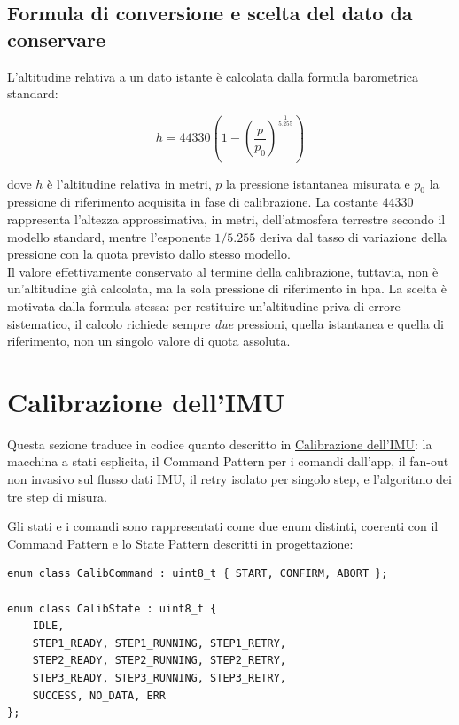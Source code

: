 \subsection{Formula di conversione e scelta del dato da conservare}

L'altitudine relativa a un dato istante è calcolata dalla formula
barometrica standard:

\begin{equation}
    h = 44330 \left( 1 - \left( \frac{p}{p_0} \right)^{\frac{1}{5.255}} \right)
    \label{eq:altitude-barometric}
\end{equation}

dove $h$ è l'altitudine relativa in metri, $p$ la pressione istantanea
misurata e $p_0$ la pressione di riferimento acquisita in fase di
calibrazione. La costante $44330$ rappresenta l'altezza approssimativa,
in metri, dell'atmosfera terrestre secondo il modello standard, mentre
l'esponente $1/5.255$ deriva dal tasso di variazione della pressione con
la quota previsto dallo stesso modello.\\

Il valore effettivamente conservato al termine della calibrazione, tuttavia,
non è un'altitudine già calcolata, ma la sola pressione di riferimento in
\gls{hpa}. La scelta è motivata dalla formula stessa: per restituire un'altitudine
priva di errore sistematico, il calcolo richiede sempre \emph{due} pressioni,
quella istantanea e quella di riferimento, non un singolo valore di quota
assoluta.

\newpage

\section{Calibrazione dell'IMU}

Questa sezione traduce in codice quanto descritto in
\hyperref[sec:calibrazione-imu]{Calibrazione dell'IMU}: la macchina a stati
esplicita, il Command Pattern per i comandi dall'app, il fan-out non invasivo
sul flusso dati IMU, il retry isolato per singolo step, e l'algoritmo dei tre
step di misura.

Gli stati e i comandi sono rappresentati come due enum distinti, coerenti con
il Command Pattern e lo State Pattern descritti in progettazione:

\begin{listing}[H]
\begin{verbatim}
enum class CalibCommand : uint8_t { START, CONFIRM, ABORT };

enum class CalibState : uint8_t {
    IDLE, 
    STEP1_READY, STEP1_RUNNING, STEP1_RETRY,
    STEP2_READY, STEP2_RUNNING, STEP2_RETRY,
    STEP3_READY, STEP3_RUNNING, STEP3_RETRY,
    SUCCESS, NO_DATA, ERR
};
\end{verbatim}
\caption{Comandi e stati della calibrazione IMU}
\label{listing:calib-states}
\end{listing}

